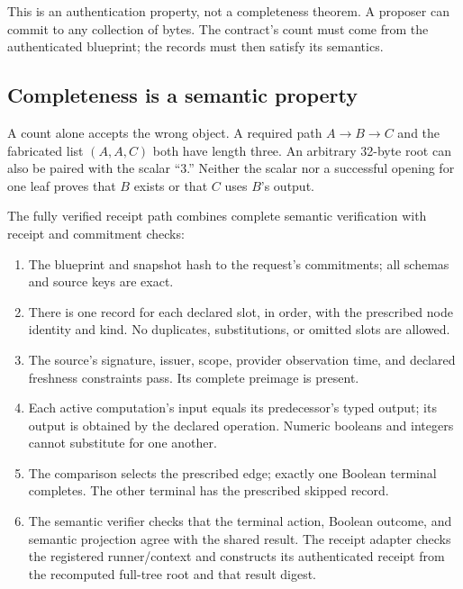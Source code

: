 This is an authentication property, not a completeness theorem. A proposer can commit to any collection of bytes. The contract's count must come from the authenticated blueprint; the records must then satisfy its semantics.

\subsection{Completeness is a semantic property}

A count alone accepts the wrong object. A required path $A\to B\to C$ and the fabricated list $(A,A,C)$ both have length three. An arbitrary 32-byte root can also be paired with the scalar ``3.'' Neither the scalar nor a successful opening for one leaf proves that $B$ exists or that $C$ uses $B$'s output.

The fully verified receipt path combines complete semantic verification with receipt and commitment checks:
\begin{enumerate}
\item The blueprint and snapshot hash to the request's commitments; all schemas and source keys are exact.
\item There is one record for each declared slot, in order, with the prescribed node identity and kind. No duplicates, substitutions, or omitted slots are allowed.
\item The source's signature, issuer, scope, provider observation time, and declared freshness constraints pass. Its complete preimage is present.
\item Each active computation's input equals its predecessor's typed output; its output is obtained by the declared operation. Numeric booleans and integers cannot substitute for one another.
\item The comparison selects the prescribed edge; exactly one Boolean terminal completes. The other terminal has the prescribed skipped record.
\item The semantic verifier checks that the terminal action, Boolean outcome, and semantic projection agree with the shared result. The receipt adapter checks the registered runner/context and constructs its authenticated receipt from the recomputed full-tree root and that result digest.
\end{enumerate}

